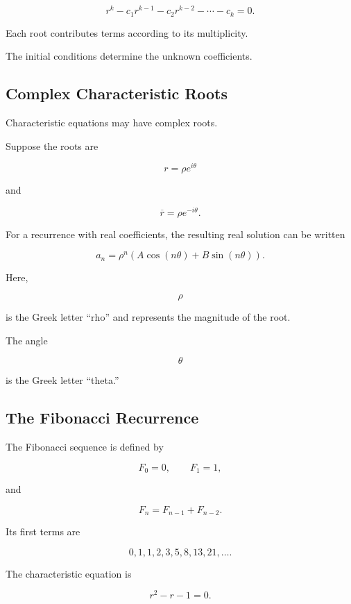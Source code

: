 \[
\boxed{
r^k
-
c_1r^{k-1}
-
c_2r^{k-2}
-\cdots-
c_k
=
0.
}
\]

Each root contributes terms according to its multiplicity.

The initial conditions determine the unknown coefficients.

\subsection{Complex Characteristic Roots}
\label{subsec:complex-characteristic-roots}

Characteristic equations may have complex roots.

Suppose the roots are

\[
r=\rho e^{i\theta}
\]

and

\[
\overline{r}
=
\rho e^{-i\theta}.
\]

For a recurrence with real coefficients, the resulting real solution
can be written

\[
\boxed{
a_n
=
\rho^n
\left(
A\cos(n\theta)
+
B\sin(n\theta)
\right).
}
\]

Here,

\[
\rho
\]

is the Greek letter ``rho'' and represents the magnitude of the root.

The angle

\[
\theta
\]

is the Greek letter ``theta.''

\subsection{The Fibonacci Recurrence}
\label{subsec:fibonacci-recurrence}

The Fibonacci sequence is defined by

\[
F_0=0,
\qquad
F_1=1,
\]

and

\[
\boxed{
F_n
=
F_{n-1}
+
F_{n-2}.
}
\]

Its first terms are

\[
0,1,1,2,3,5,8,13,21,\ldots.
\]

The characteristic equation is

\[
r^2-r-1=0.
\]

